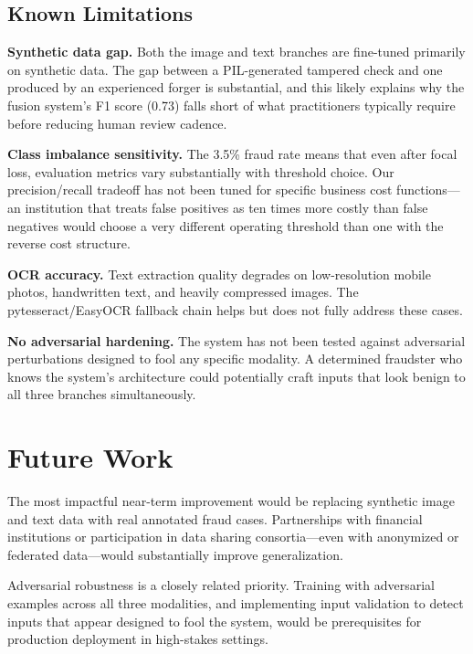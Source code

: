 \documentclass[10pt,conference,letterpaper]{IEEEtran}
\begin{document}
\subsection{Known Limitations}

\textbf{Synthetic data gap.} Both the image and text branches are fine-tuned primarily
on synthetic data. The gap between a PIL-generated tampered check and one produced by an
experienced forger is substantial, and this likely explains why the fusion system's
F1 score (0.73) falls short of what practitioners typically require before reducing
human review cadence.

\textbf{Class imbalance sensitivity.} The 3.5\% fraud rate means that even after focal
loss, evaluation metrics vary substantially with threshold choice. Our precision/recall
tradeoff has not been tuned for specific business cost functions---an institution that
treats false positives as ten times more costly than false negatives would choose a very
different operating threshold than one with the reverse cost structure.

\textbf{OCR accuracy.} Text extraction quality degrades on low-resolution mobile photos,
handwritten text, and heavily compressed images. The pytesseract/EasyOCR fallback chain
helps but does not fully address these cases.

\textbf{No adversarial hardening.} The system has not been tested against adversarial
perturbations designed to fool any specific modality. A determined fraudster who knows
the system's architecture could potentially craft inputs that look benign to all three
branches simultaneously.

\section{Future Work}

The most impactful near-term improvement would be replacing synthetic image and text data
with real annotated fraud cases. Partnerships with financial institutions or
participation in data sharing consortia---even with anonymized or federated data---would
substantially improve generalization.

Adversarial robustness is a closely related priority. Training with adversarial examples
across all three modalities, and implementing input validation to detect inputs that
appear designed to fool the system, would be prerequisites for production deployment in
high-stakes settings.
\end{document}
